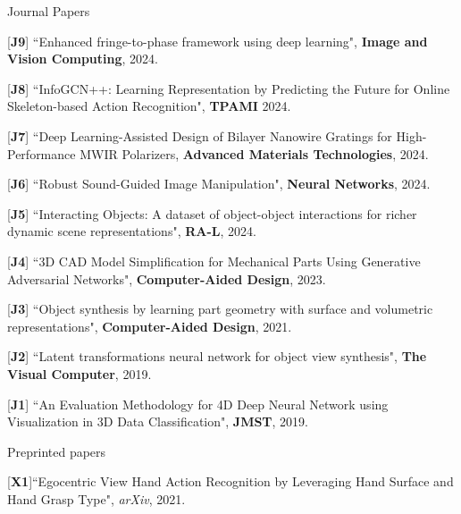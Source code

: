 \begin{cventries}
\vspace{-.5em}
\cvpub
{Journal Papers} %
{ %
\begin{cvitems}
    \item {[\textbf{J9}] ``Enhanced fringe-to-phase framework using deep learning", \textbf{Image and Vision Computing}, 2024.}
    \item {[\textbf{J8}] ``InfoGCN++: Learning Representation by Predicting the Future for Online Skeleton-based Action Recognition", \textbf{TPAMI} 2024. }
    \item {[\textbf{J7}] ``Deep Learning-Assisted Design of Bilayer Nanowire Gratings for High-Performance MWIR Polarizers, \textbf{Advanced Materials Technologies}, 2024. }
    \item {[\textbf{J6}] ``Robust Sound-Guided Image Manipulation", \textbf{Neural Networks}, 2024.}
    \item {[\textbf{J5}] ``Interacting Objects: A dataset of object-object interactions for richer dynamic scene representations", \textbf{RA-L}, 2024.}
    \item {[\textbf{J4}] ``3D CAD Model Simplification for Mechanical Parts Using Generative Adversarial Networks", \textbf{Computer-Aided Design}, 2023.}
    \item {[\textbf{J3}] ``Object synthesis by learning part geometry with surface and volumetric representations", \textbf{Computer-Aided Design}, 2021.}
    \item {[\textbf{J2}] ``Latent transformations neural network for object view synthesis", \textbf{The Visual Computer}, 2019.}
    \item {[\textbf{J1}] ``An Evaluation Methodology for 4D Deep Neural Network using Visualization in 3D Data Classification", \textbf{JMST}, 2019.}
\end{cvitems}
}

\vspace{-.5em}
\cvpub
{Preprinted papers} %
{
\begin{cvitems}
    \item {[\textbf{X1}]``Egocentric View Hand Action Recognition by Leveraging Hand Surface and Hand Grasp Type", \textit{arXiv}, 2021. }
\end{cvitems}
}


\end{cventries}
